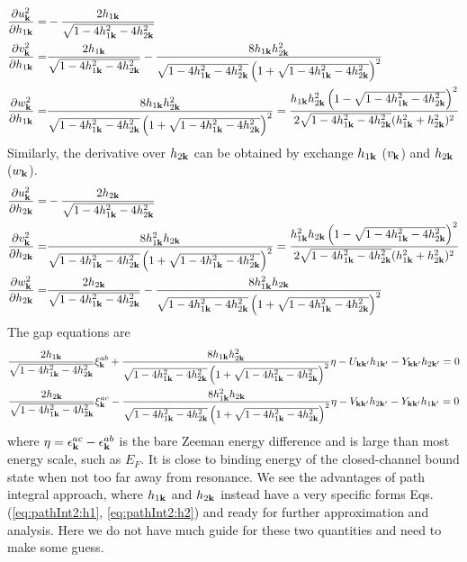 \begin{equation}
\begin{split}
\frac{\partial{u_{\ensuremath{\mathbf{k}}}^2}}{\partial{h_{1\ensuremath{\mathbf{k}}}}}=&-\frac{2 h_{1\mathbf{k}}}{\sqrt{1-4 h_{1\mathbf{k}}^2-4 h_{2\mathbf{k}}^2}}\\
\frac{\partial{v_{\ensuremath{\mathbf{k}}}^2}}{\partial{h_{1\ensuremath{\mathbf{k}}}}}=&\frac{2 h_{1\mathbf{k}}}{\sqrt{1-4 h_{1\mathbf{k}}^2-4 h_{2\mathbf{k}}^2}}-\frac{8 h_{1\mathbf{k}} h_{2\mathbf{k}}^2}{\sqrt{1-4 h_{1\mathbf{k}}^2-4 h_{2\mathbf{k}}^2} \left(1+\sqrt{1-4 h_{1\mathbf{k}}^2-4 h_{2\mathbf{k}}^2}\right)^2}\\
\frac{\partial{w_{\ensuremath{\mathbf{k}}}^2}}{\partial{h_{1\ensuremath{\mathbf{k}}}}}=&\frac{8 h_{1\mathbf{k}} h_{2\mathbf{k}}^2}{\sqrt{1-4 h_{1\mathbf{k}}^2-4 h_{2\mathbf{k}}^2} \left(1+\sqrt{1-4 h_{1\mathbf{k}}^2-4 h_{2\mathbf{k}}^2}\right)^2}
=\frac{h_{1\mathbf{k}} h_{2\mathbf{k}}^2 \left(1-\sqrt{1-4 h_{1\mathbf{k}}^2-4 h_{2\mathbf{k}}^2}\right)^2}{2\sqrt{1-4 h_{1\mathbf{k}}^2-4 h_{2\mathbf{k}}^2} (h_{1\mathbf{k}}^2 + h_{2\mathbf{k}}^2)^2}
\end{split}
\end{equation}
Similarly, the derivative over $h_{2\mathbf{k}}$ can be obtained by exchange $h_{1\mathbf{k}}$ ($v_{\mathbf{k}}$) and $h_{2\mathbf{k}}$ ($w_{\mathbf{k}}$).
\begin{equation}
\begin{split}
\frac{\partial{u_{\ensuremath{\mathbf{k}}}^2}}{\partial{h_{2\ensuremath{\mathbf{k}}}}}=&-\frac{2 h_{2\mathbf{k}}}{\sqrt{1-4 h_{1\mathbf{k}}^2-4 h_{2\mathbf{k}}^2}}\\
\frac{\partial{v_{\ensuremath{\mathbf{k}}}^2}}{\partial{h_{2\ensuremath{\mathbf{k}}}}}=&\frac{8 h_{1\mathbf{k}} ^{2}h_{2\mathbf{k}}}{\sqrt{1-4 h_{1\mathbf{k}}^2-4 h_{2\mathbf{k}}^2} \left(1+\sqrt{1-4 h_{1\mathbf{k}}^2-4 h_{2\mathbf{k}}^2}\right)^2}
=\frac{h_{1\mathbf{k}}^{2}h_{2\mathbf{k}} \left(1-\sqrt{1-4 h_{1\mathbf{k}}^2-4 h_{2\mathbf{k}}^2}\right)^2}{2\sqrt{1-4 h_{1\mathbf{k}}^2-4 h_{2\mathbf{k}}^2} (h_{1\mathbf{k}}^2 + h_{2\mathbf{k}}^2)^2}\\
\frac{\partial{w_{\ensuremath{\mathbf{k}}}^2}}{\partial{h_{2\ensuremath{\mathbf{k}}}}}=&\frac{2 h_{2\mathbf{k}}}{\sqrt{1-4 h_{1\mathbf{k}}^2-4 h_{2\mathbf{k}}^2}}-\frac{8 h_{1\mathbf{k}} ^{2}h_{2\mathbf{k}}}{\sqrt{1-4 h_{1\mathbf{k}}^2-4 h_{2\mathbf{k}}^2} \left(1+\sqrt{1-4 h_{1\mathbf{k}}^2-4 h_{2\mathbf{k}}^2}\right)^2}
\end{split}
\end{equation}
The gap equations are 
\begin{subequations}\label{eq:20100909:fullgap}
\begin{gather}
\frac{2h_{1\mathbf{k}}}{\sqrt{1-4 h_{1\mathbf{k}}^2-4 h_{2\mathbf{k}}^2}} \xi^{ab}_{\mathbf{k}}+\frac{8 h_{1\mathbf{k}} h_{2\mathbf{k}}^2}{\sqrt{1-4 h_{1\mathbf{k}}^2-4 h_{2\mathbf{k}}^2} \left(1+\sqrt{1-4 h_{1\mathbf{k}}^2-4 h_{2\mathbf{k}}^2}\right)^2}\eta-U_{\mathbf{k}\mathbf{k}'}h_{1\mathbf{k}'}-Y_{\mathbf{k}\mathbf{k}'}h_{2\mathbf{k}'}=0
\label{eq:20100909:fullgapa}\\
\frac{2h_{2\mathbf{k}}}{\sqrt{1-4 h_{1\mathbf{k}}^2-4 h_{2\mathbf{k}}^2}} \xi^{ac}_{\mathbf{k}}-\frac{8 h_{1\mathbf{k}}^{2} h_{2\mathbf{k}}}{\sqrt{1-4 h_{1\mathbf{k}}^2-4 h_{2\mathbf{k}}^2} \left(1+\sqrt{1-4 h_{1\mathbf{k}}^2-4 h_{2\mathbf{k}}^2}\right)^2}\eta-V_{\mathbf{k}\mathbf{k}'}h_{2\mathbf{k}'}-Y_{\mathbf{k}\mathbf{k}'}h_{1\mathbf{k}'}=0
\label{eq:20100909:fullgapb}
\end{gather}
\end{subequations}
where $\eta=\epsilon^{ac}_{\mathbf{k}}-\epsilon^{ab}_{\mathbf{k}}$ is the bare Zeeman energy difference and is large than most energy scale, such as $E_{F}$.  It is close to  binding energy of the closed-channel bound state when not too far away from resonance.   We see the advantages of path integral approach, where $h_{1\mathbf{k}}$ and $h_{2\mathbf{k}}$ instead have a very specific forms Eqs. (\ref{eq:pathInt2:h1}, \ref{eq:pathInt2:h2}) and ready for further approximation and analysis.  Here we do not have much guide for these two quantities and need to make some guess.  

